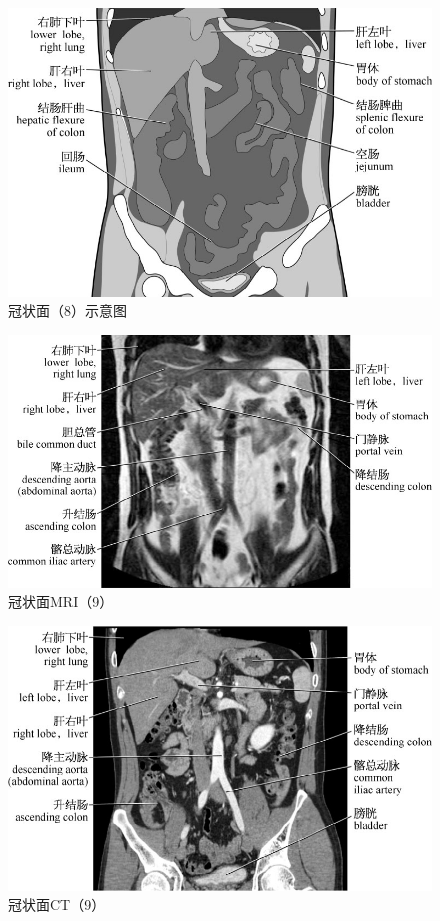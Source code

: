 \begin{figure}[!htbp]
 \centering
 \includegraphics{./images/Image00115.jpg}
 \captionsetup{justification=centering}
 \caption{冠状面（8）示意图}
  \end{figure} 
 \FloatBarrier

\begin{figure}[!htbp]
 \centering
 \includegraphics{./images/Image00116.jpg}
 \captionsetup{justification=centering}
 \caption{冠状面MRI（9）}
  \end{figure} 
 \FloatBarrier

\begin{figure}[!htbp]
 \centering
 \includegraphics{./images/Image00117.jpg}
 \captionsetup{justification=centering}
 \caption{冠状面CT（9）}
  \end{figure} 
 \FloatBarrier

